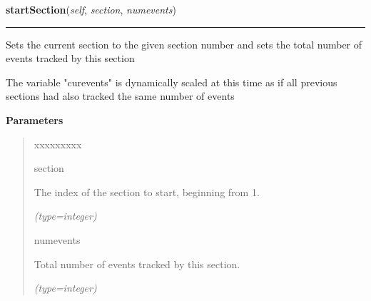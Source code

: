 \hspace{.8\funcindent}\begin{boxedminipage}{\funcwidth}

    \raggedright \textbf{startSection}(\textit{self}, \textit{section}, \textit{numevents})

    \vspace{-1.5ex}

    \rule{\textwidth}{0.5\fboxrule}
\setlength{\parskip}{2ex}
    Sets the current section to the given section number and sets the total
    number of events tracked by this section

    The variable "curevents" is dynamically scaled at this time as if all 
    previous sections had also tracked the same number of events

\setlength{\parskip}{1ex}
      \textbf{Parameters}
      \vspace{-1ex}

      \begin{quote}
        \begin{Ventry}{xxxxxxxxx}

          \item[section]

          The index of the section to start, beginning from 1.

            {\it (type=integer)}

          \item[numevents]

          Total number of events tracked by this section.

            {\it (type=integer)}

        \end{Ventry}

      \end{quote}

    \end{boxedminipage}

    \label{morpher:misc:section_reporter:SectionReporter:pulse}

    \vspace{0.5ex}

